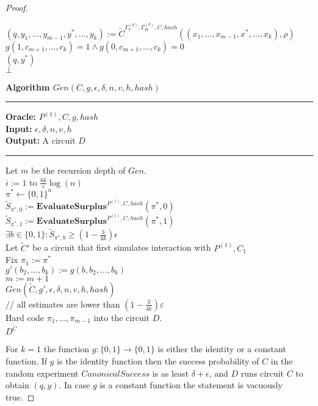 \begin{proof}
\begin{codeblock}
  \IndI $(q,y_1, \dots, y_{m-1}, y^*, \dots, y_k) := \widetilde{C}^{\Gamma_V^{(g)}, \Gamma_H^{(k)}, C, hash}((x_1, \dots, x_{m-1}, x^*, \dots, x_k), \rho)$\\
  \IndI \If $g(1,c_{m+1}, \dots, c_k) =1 \land g(0,c_{m+1}, \dots, c_k) = 0$ \then \\
  \IndII \return $(q, y^*)$ \\
  \return $\bot$
%
\end{codeblock}
%
\begin{codeblock}
  \textbf{Algorithm $Gen(C, g, \epsilon, \delta, n, v, h, hash)$}
  \medskip
  \hrule
  \medskip
  \textbf{Oracle:} $ P^{(1)}, C, g, hash$ \\
  \textbf{Input:}  $\epsilon, \delta, n, v, h$\\
  \textbf{Output:} A circuit $D$
  \medskip\hrule\medskip
  Let $m$ be the recursion depth of $Gen$.\\
  \For $i:=1$ to $\frac{6k}{\epsilon}\log(n)$ \\
  \IndI $\pi^* \leftarrow \{0,1\}^{n}$\\
  \IndI $\widetilde{S}_{\pi^*,0} := \textbf{EvaluateSurplus}^{P^{(1)}, C, hash}(\pi^*, 0)$\\
  \IndI $\widetilde{S}_{\pi^*,1} := \textbf{EvaluateSurplus}^{P^{(1)}, C, hash}(\pi^*, 1)$\\
  \IndI \If $ \exists b \in \{0,1\}: \widetilde{S}_{\pi^*,b} \geq (1 - \frac{3}{4k}) \epsilon$ \\
  \IndII Let $\widetilde{C}'$ be a circuit that first simulates interaction with $P^{(1)}, C_1$ \\
  \IndII Fix $\pi_1 := \pi^*$ \\
  \IndII $g'(b_2, \dots, b_k) := g(b, b_2, \dots, b_k)$\\
  \IndII $m := m + 1$\\
  \IndII\return $Gen(\widetilde{C}, g', \epsilon, \delta, n, v, h, hash)$ \\

  // all estimates are lower than $(1-\frac{3}{4k})\varepsilon$\\
  Hard code $\pi_1, \dots, \pi_{m-1}$ into the circuit $D$. \\
  \return $D^{\widetilde{C}}$
\end{codeblock}
%
%
For $k=1$ the function $g: \{0,1\} \rightarrow \{0,1\}$ is either the identity or a constant function.
If $g$ is the identity function then the success probability of $C$ in the random experiment $CanonicalSuccess$ is as least $\delta + \epsilon$,
and $D$ runs circuit $C$ to obtain $(q,y)$. In case $g$ is a constant function the statement is vacuously true.


\end{proof}
